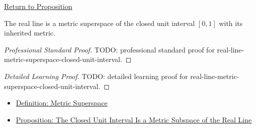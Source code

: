 \newpage
{}
\label{prf:real-line-metric-superspace-closed-unit-interval}

\begin{remark*}[Return]
\hyperref[prop:real-line-metric-superspace-closed-unit-interval]{Return to Proposition}
\end{remark*}

\begin{proposition*}
The real line is a metric superspace of the closed unit interval \([0,1]\)
with its inherited metric.
\end{proposition*}

\begin{proof}[Professional Standard Proof]
\LRAProofBodyStart
TODO: professional standard proof for real-line-metric-superspace-closed-unit-interval.
\end{proof}

\begin{proof}[Detailed Learning Proof]
\LRAProofBodyStart
TODO: detailed learning proof for real-line-metric-superspace-closed-unit-interval.
\end{proof}

\begin{remark*}
\end{remark*}

\begin{dependencies}
\begin{itemize}
  \item \hyperref[def:metric-superspace]{Definition: Metric Superspace}
  \item \hyperref[prop:closed-unit-interval-metric-subspace]{Proposition: The Closed Unit Interval Is a Metric Subspace of the Real Line}
\end{itemize}
\end{dependencies}

\clearpage
